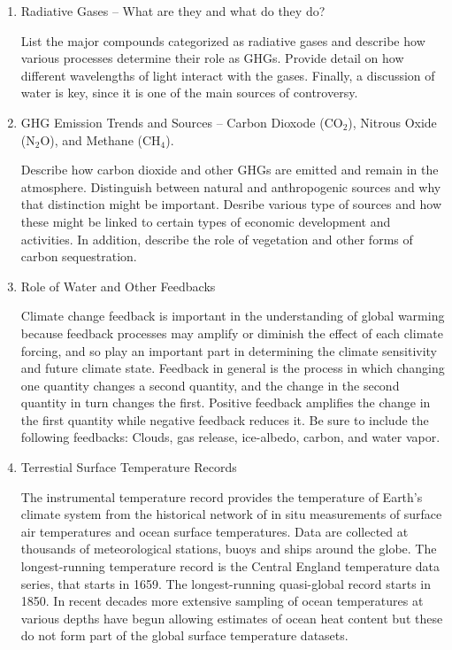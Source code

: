 \documentclass{article}\usepackage[]{graphicx}\usepackage[]{color}
\begin{document}
\begin{enumerate}
  \item Radiative Gases -- What are they and what do they do?
  
List the major compounds categorized as radiative gases and describe how various processes determine their role as GHGs. Provide detail on how different wavelengths of light interact with the gases. Finally, a discussion of water is key, since it is one of the main sources of controversy. 
  
  \item GHG Emission Trends and Sources -- Carbon Dioxode (CO$_2$), Nitrous Oxide (N$_2$O), and Methane (CH$_4$).

Describe how carbon dioxide and other GHGs are emitted and remain in the atmosphere. Distinguish between natural and anthropogenic sources and why that distinction might be important. Desribe various type of sources and how these might be linked to certain types of economic development and activities. In addition, describe the role of vegetation and other forms of carbon sequestration.

  \item Role of Water and Other Feedbacks
  
Climate change feedback is important in the understanding of global warming because feedback processes may amplify or diminish the effect of each climate forcing, and so play an important part in determining the climate sensitivity and future climate state. Feedback in general is the process in which changing one quantity changes a second quantity, and the change in the second quantity in turn changes the first. Positive feedback amplifies the change in the first quantity while negative feedback reduces it. Be sure to include the following feedbacks: Clouds, gas release, ice-albedo, carbon, and water vapor.

  \item Terrestial Surface Temperature Records
  
The instrumental temperature record provides the temperature of Earth's climate system from the historical network of in situ measurements of surface air temperatures and ocean surface temperatures. Data are collected at thousands of meteorological stations, buoys and ships around the globe. The longest-running temperature record is the Central England temperature data series, that starts in 1659. The longest-running quasi-global record starts in 1850. In recent decades more extensive sampling of ocean temperatures at various depths have begun allowing estimates of ocean heat content but these do not form part of the global surface temperature datasets.
  

\end{enumerate}
\end{document}
